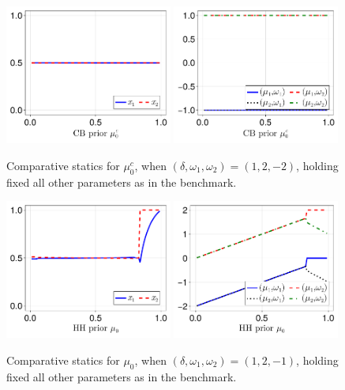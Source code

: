 \documentclass[12pt,a4paper]{article}
\begin{document}
\begin{figure}[H]
\centering
\includegraphics[width=0.49\textwidth]{figures/V8/γ_1/fig_optimal_π_across_μ_0_c_ω_1_2_ω_2_-2_δ_1.0_.pdf}
\includegraphics[width=0.49\textwidth]{figures/V8/γ_1/fig_posterior_across_μ_0_c_ω_1_2_ω_2_-2_δ_1.0_.pdf}
\caption{Comparative statics for $\mu_0^c$, when $(\delta,\omega_1,\omega_2)=(1,2,-2)$, holding fixed all other parameters as in the benchmark.}
\label{FigureA30}
\end{figure}

\begin{figure}[H]
\centering
\includegraphics[width=0.49\textwidth]{figures/V8/γ_1/fig_optimal_π_across_μ_0_ω_1_2_ω_2_-1_δ_1.0_.pdf}
\includegraphics[width=0.49\textwidth]{figures/V8/γ_1/fig_posterior_across_μ_0_ω_1_2_ω_2_-1_δ_1.0_.pdf}
\caption{Comparative statics for $\mu_0$, when $(\delta,\omega_1,\omega_2)=(1,2,-1)$, holding fixed all other parameters as in the benchmark.}
\label{FigureA31}
\end{figure}
\end{document}
